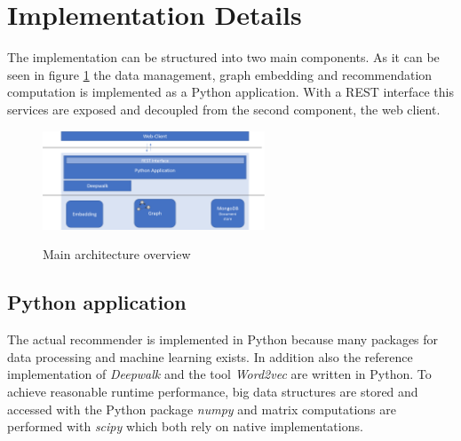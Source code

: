 \documentclass[sigconf]{acmart}
\begin{document}




\newpage
\appendix
\section{Implementation Details}

The implementation can be structured into two main components. As it can be seen in figure \ref{fig:architecture} the data management, graph embedding and recommendation computation is implemented as a Python application. With a REST interface this services are exposed and decoupled from the second component, the web client.

\begin{figure}[ht]
	{\includegraphics[width=250px]{architecture.png}}	
	\caption{Main architecture overview}
	\label{fig:architecture}
\end{figure}

\subsection{Python application}
The actual recommender is implemented in Python because many packages for data processing and machine learning exists. In addition also the reference implementation of \emph{Deepwalk} and the tool \emph{Word2vec} are written in Python. To achieve reasonable runtime performance, big data structures are stored and accessed with the Python package \emph{numpy} and matrix computations are performed with \emph{scipy} which both rely on native implementations.

\end{document}
